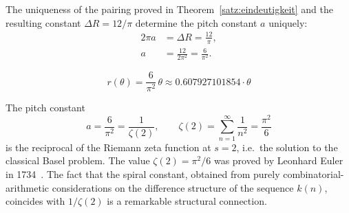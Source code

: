 The uniqueness of the pairing proved in Theorem~\ref{satz:eindeutigkeit}
and the resulting constant $\Delta R = 12/\pi$ determine the
pitch constant $a$ uniquely:
\begin{align}
  2\pi a &= \Delta R = \frac{12}{\pi},\\[4pt]
  a &= \frac{12}{2\pi^2} = \frac{6}{\pi^2}.
\end{align}

\begin{satz}
\begin{equation}
  \boxed{
    r(\theta) = \frac{6}{\pi^2}\,\theta
    \approx 0.607927101854 \cdot \theta
  }
\end{equation}
\end{satz}

\begin{bemerkung}
The pitch constant
\[
  a = \frac{6}{\pi^2} = \frac{1}{\zeta(2)},
  \qquad
  \zeta(2) = \sum_{n=1}^{\infty} \frac{1}{n^2} = \frac{\pi^2}{6}
\]
is the reciprocal of the Riemann zeta function at $s=2$, i.e.\
the solution to the classical Basel problem. The value $\zeta(2) = \pi^2/6$
was proved by Leonhard Euler in 1734~\cite{Euler1740,Hardy2008}. The fact that the spiral constant,
obtained from purely combinatorial-arithmetic considerations on the
difference structure of the sequence $k(n)$, coincides with $1/\zeta(2)$
is a remarkable structural connection.
\end{bemerkung}
